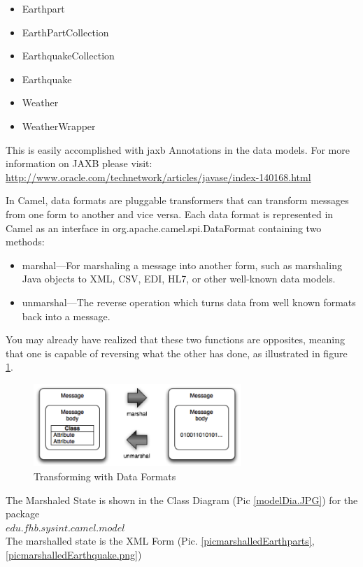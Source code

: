 \documentclass[11pt,english,ngerman, headsepline]{scrreprt}
\begin{document}
\begin{itemize}
  \item Earthpart
  \item EarthPartCollection
  \item EarthquakeCollection
  \item Earthquake
  \item Weather
  \item WeatherWrapper
\end{itemize}

This is easily accomplished with jaxb Annotations in the data models. For more
information on JAXB please visit: \\
\url{http://www.oracle.com/technetwork/articles/javase/index-140168.html}

In Camel, data formats are pluggable transformers that can transform messages
from one form to another and vice versa. Each data format is represented in
Camel as an interface in org.apache.camel.spi.DataFormat containing two methods:
\begin{itemize}
  \item marshal—For marshaling a message into another form, such as
marshaling Java objects to XML, CSV, EDI, HL7, or other well-known data
models.
\item unmarshal—The reverse operation which turns data from well known 
formats back into a message.
\end{itemize}
You may already have realized that these two functions are
opposites, meaning that one is capable of reversing what the other has done, as illustrated in
figure \ref{picMarshalling}. \cite{ibsen2010camel}



  \begin{figure}[h!]
	\begin{center}
	\includegraphics[width=0.7\textwidth]{pics/marshalling}
	\end{center}
	\caption{Transforming with Data Formats \cite{hohpe2003enterprise}}
	\label{picMarshalling} 
   \end{figure}

The Marshaled State is shown in the Class Diagram (Pic \ref{modelDia.JPG}) for
the package\\ $edu.fhb.sysint.camel.model$\\
The marshalled state is the XML Form (Pic. \ref{picmarshalledEarthparts},
\ref{picmarshalledEarthquake.png})
\end{document}
